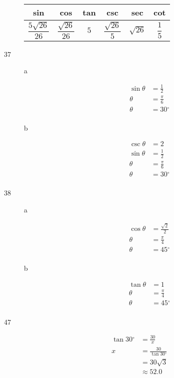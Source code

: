 \documentclass[fleqn,addpoints]{exam}
\newcommand{\degree}{\ensuremath{^\circ}}
\begin{document}
\begin{description}
\begin{tabular}{cccccc}
\toprule
sin & cos & tan & csc & sec & cot \\
\midrule
  $\dfrac{5 \sqrt{26}}{26}$ &  $\dfrac{\sqrt{26}}{26}$ & $5$ & $\dfrac{\sqrt{26}}{5}$ & $\sqrt{26}$ & $\dfrac{1}{5}$ \\
\bottomrule
\end{tabular}

\item[37]
\begin{description}
\item[a]
\begin{align*}
  \sin \theta &= \frac{1}{2} \\
  \theta &= \frac{\pi}{6} \\  
  \theta &= 30 \degree \\
\end{align*}

\item[b]
\begin{align*}
  \csc \theta &= 2 \\
  \sin \theta &= \frac{1}{2} \\
  \theta &= \frac{\pi}{6} \\
  \theta &= 30 \degree \\
\end{align*}

\end{description}

\item[38]
\begin{description}
\item[a]
\begin{align*}
  \cos \theta &= \frac{\sqrt{2}}{2} \\
  \theta &= \frac{\pi}{4} \\
  \theta &= 45 \degree \\
\end{align*}

\item[b]
\begin{align*}
  \tan \theta &= 1 \\
  \theta &= \frac{\pi}{4} \\
  \theta &= 45 \degree \\
\end{align*}

\end{description}

\item[47]
\begin{align*}
  \tan 30 \degree &= \frac{30}{x} \\
   x &= \frac{30}{\tan 30 \degree} \\
   &= 30 \sqrt{3} \\
   & \approx 52.0 \\
\end{align*}


\end{description}
\end{document}
